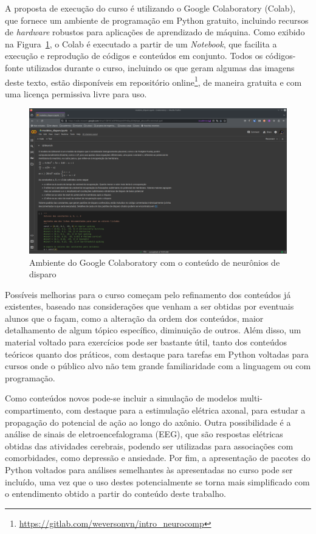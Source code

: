 A proposta de execução do curso é utilizando o Google Colaboratory (Colab), que fornece um ambiente de programação em Python gratuito, incluindo recursos de \textit{hardware} robustos para aplicações de aprendizado de máquina.
Como exibido na Figura~\ref{fig:colab}, o Colab é executado a partir de um \textit{Notebook}, que facilita a execução e reprodução de códigos e conteúdos em conjunto.
Todos os códigos-fonte utilizados durante o curso, incluindo os que geram algumas das imagens deste texto, estão disponíveis em repositório online\footnote{\url{https://gitlab.com/weversonvn/intro_neurocomp}}, de maneira gratuita e com uma licença permissiva livre para uso.
\begin{figure}[tb]
	\centering
	\caption[Ambiente do Google Colaboratory com o conteúdo de neurônios de disparo]{Ambiente do Google Colaboratory com o conteúdo de neurônios de disparo}
	\label{fig:colab}
	\includegraphics[width=0.7\linewidth]{figs/colab}
\end{figure}

Possíveis melhorias para o curso começam pelo refinamento dos conteúdos já existentes, baseado nas considerações que venham a ser obtidas por eventuais alunos que o façam, como a alteração da ordem dos conteúdos, maior detalhamento de algum tópico específico, diminuição de outros. Além disso, um material voltado para exercícios pode ser bastante útil, tanto dos conteúdos teóricos quanto dos práticos, com destaque para tarefas em Python voltadas para cursos onde o público alvo não tem grande familiaridade com a linguagem ou com programação.

Como conteúdos novos pode-se incluir a simulação de modelos multi-compartimento, com destaque para a estimulação elétrica axonal, para estudar a propagação do potencial de ação ao longo do axônio.
Outra possibilidade é a análise de sinais de eletroencefalograma (EEG), que são respostas elétricas obtidas das atividades cerebrais, podendo ser utilizadas para associações com comorbidades, como depressão e ansiedade.
Por fim, a apresentação de pacotes do Python voltados para análises semelhantes às apresentadas no curso pode ser incluído, uma vez que o uso destes potencialmente se torna mais simplificado com o entendimento obtido a partir do conteúdo deste trabalho.